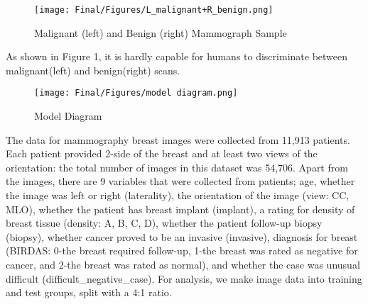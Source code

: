\documentclass[11pt,letterpaper, twocolumn]{article}
\begin{document}
\begin{figure}[H]
    \centering
    \texttt{[image: Final/Figures/L\_malignant+R\_benign.png]}
    \caption{Malignant (left) and Benign (right) Mammograph Sample}
    \label{fig:malignant}
\end{figure}
As shown in Figure 1, it is hardly capable for humans to discriminate between malignant(left) and benign(right) scans.

\begin{figure*}[t]
    \centering
    \texttt{[image: Final/Figures/model diagram.png]}
    \caption{Model Diagram}
    \label{fig:final_model_diagram}
\end{figure*}
The data for mammography breast images were collected from 11,913 patients. Each patient provided 2-side of the breast and at least two views of the orientation: the total number of images in this dataset was 54,706. Apart from the images, there are 9 variables that were collected from patients; age, whether the image was left or right (laterality), the orientation of the image (view: CC, MLO), whether the patient has breast implant (implant), a rating for density of breast tissue (density: A, B, C, D), whether the patient follow-up biopsy (biopsy), whether cancer proved to be an invasive (invasive), diagnosis for breast (BIRDAS: 0-the breast required follow-up, 1-the breast was rated as negative for cancer, and 2-the breast was rated as normal), and whether the case was unusual difficult (difficult\_negative\_case). For analysis, we make image data into training and test groups, split with a 4:1 ratio. 

\begin{table}[H]
\caption{Data sizes per groups}
\end{table}
\end{document}

